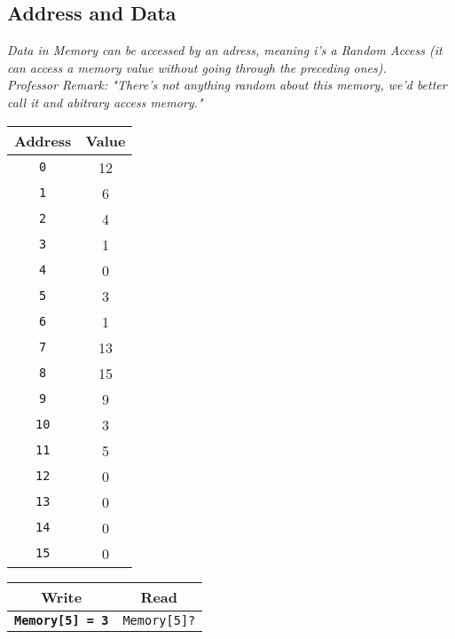\subsection{Address and Data}
\textit{Data in Memory can be accessed by an adress, meaning i's a \textit{Random Access} (it can access a memory value without going through the preceding ones).} \\ \vspace*{5px}
\textit{Professor Remark: "There's not anything random about this memory, we'd better call it and abitrary access memory."} \\ \vspace*{5px}
\vspace*{5px}
\begin{minipage}[htp]{0.45\textwidth}
\begin{center}
    \begin{tabular}{|c|c|}
    \hline
    \textbf{Address} & \textbf{Value} \\
    \hline
    \texttt{0} & 12 \\
    \hline
    \texttt{1} & 6 \\
    \hline
    \texttt{2} & 4 \\
    \hline
    \texttt{3} & 1 \\
    \hline
    \texttt{4} & 0 \\
    \hline
    \texttt{5} & 3 \\
    \hline
    \texttt{6} & 1 \\
    \hline
    \texttt{7} & 13 \\
    \hline
    \texttt{8} & 15 \\
    \hline
    \texttt{9} & 9 \\
    \hline
    \texttt{10} & 3 \\
    \hline
    \texttt{11} & 5 \\
    \hline
    \texttt{12} & 0 \\
    \hline
    \texttt{13} & 0 \\
    \hline
    \texttt{14} & 0 \\
    \hline
    \texttt{15} & 0 \\
    \hline
    \end{tabular}
\end{center}
\end{minipage}
\hfill
\vline
\hfill
\begin{minipage}[htp]{0.45\textwidth}
\begin{center}
    \begin{tabular}{|c|c|}
    \hline
    \textbf{Write} & \textbf{Read} \\
    \hline
    \texttt{\textbf{Memory[5] = 3}} & \texttt{Memory[5]?} \\
    \hline
    \end{tabular}
\end{center}
\end{minipage}

